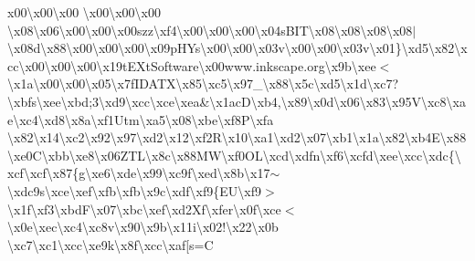 \begin{DoxyCompactItemize}
{}x00\textbackslash{}x00\textbackslash{}x00 \textbackslash{}x00\textbackslash{}x00\textbackslash{}x00 \textbackslash{}x08\textbackslash{}x06\textbackslash{}x00\textbackslash{}x00\textbackslash{}x00szz\textbackslash{}xf4\textbackslash{}x00\textbackslash{}x00\textbackslash{}x00\textbackslash{}x04s\+B\+I\+T\textbackslash{}x08\textbackslash{}x08\textbackslash{}x08\textbackslash{}x08$\vert$\textbackslash{}x08d\textbackslash{}x88\textbackslash{}x00\textbackslash{}x00\textbackslash{}x00\textbackslash{}x09p\+H\+Ys\textbackslash{}x00\textbackslash{}x00\textbackslash{}x03v\textbackslash{}x00\textbackslash{}x00\textbackslash{}x03v\textbackslash{}x01\}\textbackslash{}xd5\textbackslash{}x82\textbackslash{}xcc\textbackslash{}x00\textbackslash{}x00\textbackslash{}x00\textbackslash{}x19t\+E\+Xt\+Software\textbackslash{}x00www.\+inkscape.\+org\textbackslash{}x9b\textbackslash{}xee$<$\textbackslash{}x1a\textbackslash{}x00\textbackslash{}x00\textbackslash{}x05\textbackslash{}x7f\+I\+D\+A\+T\+X\textbackslash{}x85\textbackslash{}xc5\textbackslash{}x97\+\_\+\textbackslash{}x88\textbackslash{}x5c\textbackslash{}xd5\textbackslash{}x1d\textbackslash{}xc7?\textbackslash{}xbfs\textbackslash{}xee\textbackslash{}xbd;3\textbackslash{}xd9\textbackslash{}xcc\textbackslash{}xce\textbackslash{}xea\&\textbackslash{}x1ac\+D\textbackslash{}xb4,\textbackslash{}x89\textbackslash{}x0d\textbackslash{}x06\textbackslash{}x83\textbackslash{}x95\+V\textbackslash{}xc8\textbackslash{}xae\textbackslash{}xc4\textbackslash{}xd8\textbackslash{}x8a\textbackslash{}xf1\+Utm\textbackslash{}xa5\textbackslash{}x08\textbackslash{}xbe\textbackslash{}xf8\+P\textbackslash{}xfa \textbackslash{}x82\textbackslash{}x14\textbackslash{}xc2\textbackslash{}x92\textbackslash{}x97\textbackslash{}xd2\textbackslash{}x12\textbackslash{}xf2\+R\textbackslash{}x10\textbackslash{}xa1\textbackslash{}xd2\textbackslash{}x07\textbackslash{}xb1\textbackslash{}x1a\textbackslash{}x82\textbackslash{}xb4\+E\textbackslash{}x88\textbackslash{}xe0\+C\textbackslash{}xbb\textbackslash{}xe8\textbackslash{}x06\+Z\+T\+L\textbackslash{}x8c\textbackslash{}x88\+M\+W\textbackslash{}xf0\+O\+L\textbackslash{}xcd\textbackslash{}xdfn\textbackslash{}xf6\textbackslash{}xcfd\textbackslash{}xee\textbackslash{}xcc\textbackslash{}xdc\{\textbackslash{}xcf\textbackslash{}xcf\textbackslash{}x87\{g\textbackslash{}xe6\textbackslash{}xde\textbackslash{}x99\textbackslash{}xc9f\textbackslash{}xed\textbackslash{}x8b\textbackslash{}x17$\sim$\textbackslash{}xdc9s\textbackslash{}xce\textbackslash{}xef\textbackslash{}xfb\textbackslash{}xfb\textbackslash{}x9c\textbackslash{}xdf\textbackslash{}xf9\{\+E\+U\textbackslash{}xf9$>$\textbackslash{}x1f\textbackslash{}xf3\textbackslash{}xbd\+F\textbackslash{}x07\textbackslash{}xbc\textbackslash{}xef\textbackslash{}xd2\+Xf\textbackslash{}xfer\textbackslash{}x0f\textbackslash{}xce$<$\textbackslash{}x0e\textbackslash{}xec\textbackslash{}xc4\textbackslash{}xc8v\textbackslash{}x90\textbackslash{}x9b\textbackslash{}x11i\textbackslash{}x02!\textbackslash{}x22\textbackslash{}x0b \textbackslash{}xc7\textbackslash{}xc1\textbackslash{}xcc\textbackslash{}xe9k\textbackslash{}x8f\textbackslash{}xcc\textbackslash{}xaf\mbox{[}s=\+C 
\end{DoxyCompactItemize}
